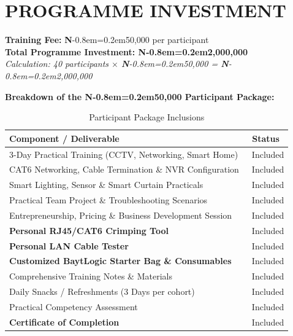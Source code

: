 \documentclass[11pt,a4paper]{article}
\newcommand{\naira}{\textbf{N}\kern-0.8em=\kern0.2em}
\newcommand{\checkicon}{\textcolor{baytblue}{\faCheckCircle}\ }
\begin{document}
\section{PROGRAMME INVESTMENT}

\begin{tcolorbox}[themebox]
    {\Large \textbf{Training Fee:} \naira 50,000 per participant}\\[4pt]
    {\Huge \textbf{Total Programme Investment: \naira 2,000,000}}\\[4pt]
    \textit{Calculation: 40 participants $\times$ \naira 50,000 = \naira 2,000,000}
\end{tcolorbox}

\vspace{6pt}
\noindent\textbf{\large Breakdown of the \naira 50,000 Participant Package:}

\begin{table}[h!]
\centering
{}
\begin{tabularx}{\textwidth}{X c}
\toprule
\rowcolor{baytnavy} \color{white}\textbf{Component / Deliverable} & \color{white}\textbf{Status} \\
\midrule
3-Day Practical Training (CCTV, Networking, Smart Home) & \checkicon Included \\
CAT6 Networking, Cable Termination \& NVR Configuration & \checkicon Included \\
Smart Lighting, Sensor \& Smart Curtain Practicals & \checkicon Included \\
Practical Team Project \& Troubleshooting Scenarios & \checkicon Included \\
Entrepreneurship, Pricing \& Business Development Session & \checkicon Included \\
\textbf{Personal RJ45/CAT6 Crimping Tool} & \checkicon Included \\
\textbf{Personal LAN Cable Tester} & \checkicon Included \\
\textbf{Customized BaytLogic Starter Bag \& Consumables} & \checkicon Included \\
Comprehensive Training Notes \& Materials & \checkicon Included \\
Daily Snacks / Refreshments (3 Days per cohort) & \checkicon Included \\
Practical Competency Assessment & \checkicon Included \\
\textbf{Certificate of Completion} & \checkicon Included \\
\bottomrule
\end{tabularx}
\caption{Participant Package Inclusions}
\end{table}
\end{document}
